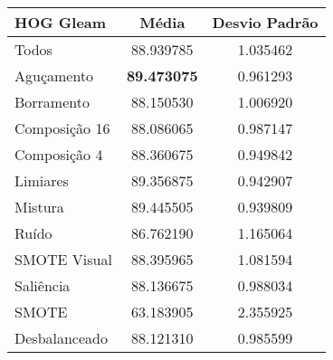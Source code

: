 \begin{table}[!htbp]
\centering
\caption{}
\label{tab:resultados:x:melhor}
\begin{tabular}{|l|c|c|}
\hline
\textbf{HOG Gleam} & \textbf{Média}     & \textbf{Desvio Padrão} \\ \hline
   Todos        &  88.939785 &  1.035462  \\ \hline
  Aguçamento    &  \textbf{89.473075} &  0.961293  \\ \hline
  Borramento    &  88.150530 &  1.006920  \\ \hline
  Composição 16 &  88.086065 &  0.987147  \\ \hline
  Composição 4  &  88.360675 &  0.949842  \\ \hline
  Limiares      &  89.356875 &  0.942907  \\ \hline
  Mistura       &  89.445505 &  0.939809  \\ \hline
  Ruído         &  86.762190 &  1.165064  \\ \hline
  SMOTE Visual  &  88.395965 &  1.081594  \\ \hline
  Saliência     &  88.136675 &  0.988034  \\ \hline
 SMOTE          &  63.183905 &  2.355925  \\ \hline
Desbalanceado   &  88.121310 &  0.985599  \\ \hline
\end{tabular}
\end{table}


